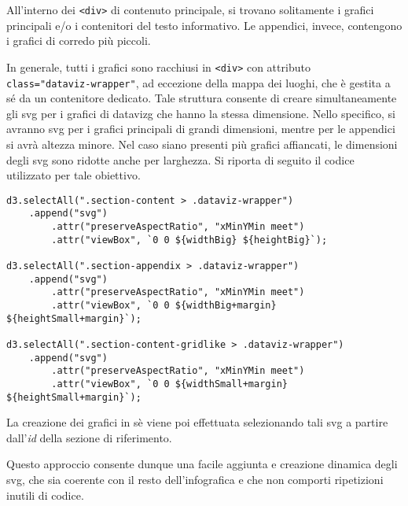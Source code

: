 All'interno dei \texttt{<div>} di contenuto principale, si trovano solitamente i grafici principali e/o i contenitori del testo informativo. Le appendici, invece, contengono i grafici di corredo più piccoli. 

In generale, tutti i grafici sono racchiusi in \texttt{<div>} con attributo \\ \texttt{class="dataviz-wrapper"}, ad eccezione della mappa dei luoghi, che è gestita a sé da un contenitore dedicato. 
Tale struttura consente di creare simultaneamente gli \gls{svg} per i grafici di \gls{datavizg} che hanno la stessa dimensione. 
Nello specifico, si avranno \gls{svg} per i grafici principali di grandi dimensioni, mentre per le appendici si avrà altezza minore. Nel caso siano presenti più grafici affiancati, le dimensioni degli \gls{svg} sono ridotte 
anche per larghezza.
Si riporta di seguito il codice utilizzato per tale obiettivo.
\begin{lstlisting}[style=htmlcssjs]
d3.selectAll(".section-content > .dataviz-wrapper")
    .append("svg")
        .attr("preserveAspectRatio", "xMinYMin meet")
        .attr("viewBox", `0 0 ${widthBig} ${heightBig}`);

d3.selectAll(".section-appendix > .dataviz-wrapper")
    .append("svg")
        .attr("preserveAspectRatio", "xMinYMin meet")
        .attr("viewBox", `0 0 ${widthBig+margin} ${heightSmall+margin}`);

d3.selectAll(".section-content-gridlike > .dataviz-wrapper")
    .append("svg")
        .attr("preserveAspectRatio", "xMinYMin meet")
        .attr("viewBox", `0 0 ${widthSmall+margin} ${heightSmall+margin}`);
\end{lstlisting}
La creazione dei grafici in sè viene poi effettuata selezionando tali \gls{svg} a partire dall'\emph{id} della sezione di riferimento. 

Questo approccio consente dunque una facile aggiunta e creazione dinamica degli \gls{svg}, che sia coerente con il resto dell'infografica
e che non comporti ripetizioni inutili di codice.

